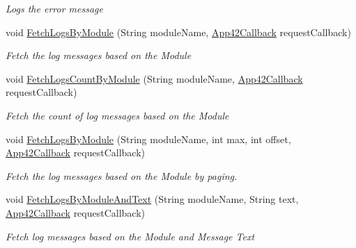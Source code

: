 \begin{DoxyCompactItemize}
\begin{DoxyCompactList}\small\item\em Logs the error message \end{DoxyCompactList}\item 
void \hyperlink{classcom_1_1shephertz_1_1app42_1_1paas_1_1sdk_1_1windows_1_1log_1_1_log_service_a52cce9d859557b26dcd153233aabd3f4}{Fetch\+Logs\+By\+Module} (String module\+Name, \hyperlink{interfacecom_1_1shephertz_1_1app42_1_1paas_1_1sdk_1_1windows_1_1_app42_callback}{App42\+Callback} request\+Callback)
\begin{DoxyCompactList}\small\item\em Fetch the log messages based on the Module \end{DoxyCompactList}\item 
void \hyperlink{classcom_1_1shephertz_1_1app42_1_1paas_1_1sdk_1_1windows_1_1log_1_1_log_service_ad64b8118f7de3d27031e0f8962f26b1c}{Fetch\+Logs\+Count\+By\+Module} (String module\+Name, \hyperlink{interfacecom_1_1shephertz_1_1app42_1_1paas_1_1sdk_1_1windows_1_1_app42_callback}{App42\+Callback} request\+Callback)
\begin{DoxyCompactList}\small\item\em Fetch the count of log messages based on the Module \end{DoxyCompactList}\item 
void \hyperlink{classcom_1_1shephertz_1_1app42_1_1paas_1_1sdk_1_1windows_1_1log_1_1_log_service_a37fde0af17609148476708dfb7d5059f}{Fetch\+Logs\+By\+Module} (String module\+Name, int max, int offset, \hyperlink{interfacecom_1_1shephertz_1_1app42_1_1paas_1_1sdk_1_1windows_1_1_app42_callback}{App42\+Callback} request\+Callback)
\begin{DoxyCompactList}\small\item\em Fetch the log messages based on the Module by paging. \end{DoxyCompactList}\item 
void \hyperlink{classcom_1_1shephertz_1_1app42_1_1paas_1_1sdk_1_1windows_1_1log_1_1_log_service_acabafcddf36a639007bb293a63a40154}{Fetch\+Logs\+By\+Module\+And\+Text} (String module\+Name, String text, \hyperlink{interfacecom_1_1shephertz_1_1app42_1_1paas_1_1sdk_1_1windows_1_1_app42_callback}{App42\+Callback} request\+Callback)
\begin{DoxyCompactList}\small\item\em Fetch log messages based on the Module and Message Text \end{DoxyCompactList}\item 

\end{DoxyCompactItemize}
